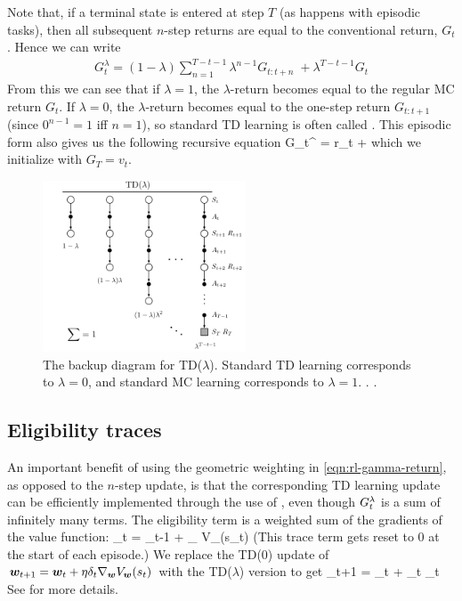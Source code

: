 Note that, if a terminal state is entered at step $T$ (as happens with episodic tasks),
then all subsequent $n$-step returns are equal to the conventional return, $G_t$.
Hence we can write
\begin{align}
  G_t^{\lambda} = (1-\lambda) \sum_{n=1}^{T-t-1}
  \lambda^{n-1} G_{t:t+n}
  \;
  + \lambda^{T-t-1} G_t
\end{align}
From this we can see that if $\lambda=1$, the $\lambda$-return
becomes equal to the regular MC return $G_t$.
If $\lambda=0$, the $\lambda$-return becomes equal to the
one-step return $G_{t:t+1}$ (since $0^{n-1}=1$ iff $n=1$),
so standard TD learning is often called
.
This episodic form also gives us the following recursive equation
\be
G_t^{\lambda} = r_t + 
\ee
which we initialize with $G_T=v_t$.

\begin{figure}
\centering
\includegraphics[height=2in]{figs/sutton-12-1}
\caption{
  The backup diagram for TD($\lambda$).
  Standard TD learning corresponds to $\lambda=0$,
  and standard MC learning corresponds to $\lambda=1$.
  .
  .
}
\label{fig:TDlambda}
\end{figure}

\subsection{Eligibility traces}
\label{sec:eligibility}


An important benefit of using the geometric weighting
in \cref{eqn:rl-gamma-return}, as opposed to the $n$-step update,
is that
the corresponding TD learning update can be
efficiently implemented  through the use of
,
even though $G_{t}^{\lambda}$ is
a sum of infinitely many terms.
The eligibility term is a weighted sum of the gradients
of the value function:
\be
\vz_t = \gamma \lambda \vz_{t-1} + \nabla_{\vw} V_{\vw}(s_t)
\ee
(This trace term gets reset to 0 at the start of each episode.)
We replace the TD(0) update of
${\bm{w}}_{t+1} = {\bm{w}}_t + \eta \delta_t \nabla_{{\bm{w}}} V_{{\bm{w}}}(s_t)$
with the TD($\lambda$) version to get
\be
\vw_{t+1} = \vw_t + \lr \delta_t \vz_t
\ee
See \citep{VanSeijen2016} for more details.

